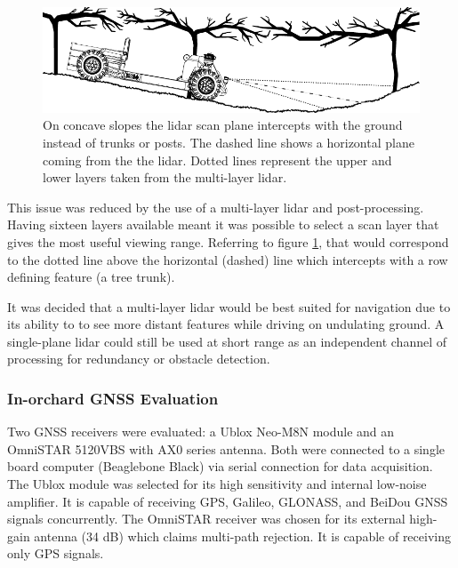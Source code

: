 \documentclass[preprint,authoryear,12pt]{elsarticle}
\begin{document}
        \begin{figure}[htb]
            \centering
            \includegraphics[width=\linewidth]{imgs/concave_slope/concave_slope_v4.pdf}
            \caption{
                On concave slopes the lidar scan plane intercepts with the ground instead of trunks or posts.
                The dashed line shows a horizontal plane coming from the the lidar.
                Dotted lines represent the upper and lower layers taken from the multi-layer lidar.
            }
            \label{fig:concaveSlope}
        \end{figure}

        This issue was reduced by the use of a multi-layer lidar and post-processing.
        Having sixteen layers available meant it was possible to select a scan layer that gives the most useful viewing range.
        Referring to figure \ref{fig:concaveSlope}, that would correspond to the dotted line above the horizontal (dashed) line which intercepts with a row defining feature (a tree trunk).

        It was decided that a multi-layer lidar would be best suited for navigation due to its ability to to see more distant features while driving on undulating ground.
        A single-plane lidar could still be used at short range as an independent channel of processing for redundancy or obstacle detection.

    \subsubsection{In-orchard GNSS Evaluation}
        Two GNSS receivers were evaluated: a Ublox Neo-M8N module and an OmniSTAR 5120VBS with AX0 series antenna.
    	Both were connected to a single board computer (Beaglebone Black) via serial connection for data acquisition.
        The Ublox module was selected for its high sensitivity and internal low-noise amplifier.
        It is capable of receiving GPS, Galileo, GLONASS, and BeiDou GNSS signals concurrently.
        The OmniSTAR receiver was chosen for its external high-gain antenna (34 dB) which claims multi-path rejection.
        It is capable of receiving only GPS signals.
\end{document}
